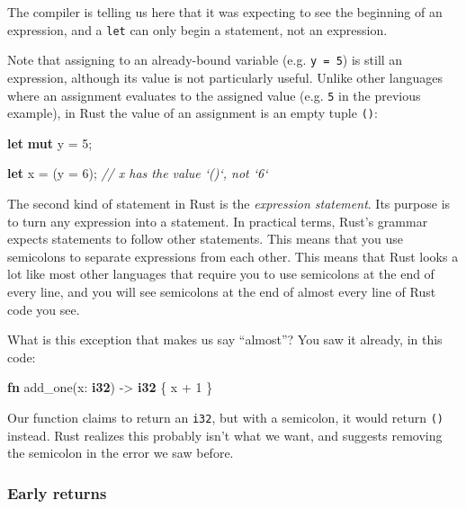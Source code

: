 \documentclass[a4paper,]{book}
\newenvironment{Shaded}{\begin{snugshade}}{\end{snugshade}}
\newcommand{\KeywordTok}[1]{\textcolor[rgb]{0.13,0.29,0.53}{\textbf{{#1}}}}
\newcommand{\DecValTok}[1]{\textcolor[rgb]{0.00,0.00,0.81}{{#1}}}
\newcommand{\CommentTok}[1]{\textcolor[rgb]{0.56,0.35,0.01}{\textit{{#1}}}}
\newcommand{\NormalTok}[1]{{#1}}
\begin{document}
The compiler is telling us here that it was expecting to see the
beginning of an expression, and a \texttt{let} can only begin a
statement, not an expression.

Note that assigning to an already-bound variable (e.g. \texttt{y\ =\ 5})
is still an expression, although its value is not particularly useful.
Unlike other languages where an assignment evaluates to the assigned
value (e.g. \texttt{5} in the previous example), in Rust the value of an
assignment is an empty tuple \texttt{()}:

\begin{Shaded}
\begin{Highlighting}[]
\KeywordTok{let} \KeywordTok{mut} \NormalTok{y = }\DecValTok{5}\NormalTok{;}

\KeywordTok{let} \NormalTok{x = (y = }\DecValTok{6}\NormalTok{);  }\CommentTok{// x has the value `()`, not `6`}
\end{Highlighting}
\end{Shaded}

The second kind of statement in Rust is the \emph{expression statement}.
Its purpose is to turn any expression into a statement. In practical
terms, Rust's grammar expects statements to follow other statements.
This means that you use semicolons to separate expressions from each
other. This means that Rust looks a lot like most other languages that
require you to use semicolons at the end of every line, and you will see
semicolons at the end of almost every line of Rust code you see.

What is this exception that makes us say ``almost''? You saw it already,
in this code:

\begin{Shaded}
\begin{Highlighting}[]
\KeywordTok{fn} \NormalTok{add_one(x: }\KeywordTok{i32}\NormalTok{) -> }\KeywordTok{i32} \NormalTok{\{}
    \NormalTok{x + }\DecValTok{1}
\NormalTok{\}}
\end{Highlighting}
\end{Shaded}

Our function claims to return an \texttt{i32}, but with a semicolon, it
would return \texttt{()} instead. Rust realizes this probably isn't what
we want, and suggests removing the semicolon in the error we saw before.

\subsubsection{Early returns}\label{early-returns}
\end{document}
